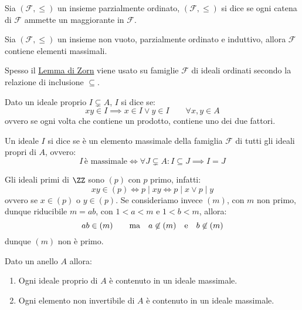 \documentclass[11pt]{scrartcl}
\begin{document}
\begin{definition}
    Sia $(\mathcal{F}, \leqslant)$ un insieme parzialmente ordinato, $(\mathcal{F}, \leqslant)$ si dice  se ogni catena di $\mathcal{F}$
    ammette un maggiorante in $\mathcal{F}$.
\end{definition}

\begin{lemma}
    \label{zorn}
    Sia $(\mathcal{F}, \leqslant)$ un insieme non vuoto, parzialmente ordinato e induttivo, allora $\mathcal{F}$ contiene elementi massimali.
\end{lemma}

\begin{remark}
    Spesso il \hyperref[zorn]{Lemma di Zorn} viene usato su famiglie $\mathcal{F}$ di ideali ordinati secondo la relazione di inclusione $\subseteq$.
\end{remark}

\begin{definition}
    Dato un ideale proprio $I \subsetneq A$, $I$ si dice  se:
        \[ xy \in I \implies x \in I \vee y \in I \qquad \forall x,y \in A
            \]
    ovvero se ogni volta che contiene un prodotto, contiene uno dei due fattori.
\end{definition}

\begin{definition}
    Un ideale $I$ si dice  se è un elemento massimale della famiglia $\mathcal{F}$ di tutti gli ideali propri di $A$, ovvero:
        \[ I \, \text{è massimale} \iff \forall J \subsetneq A : I \subseteq J \implies I = J
            \]
\end{definition}

\begin{example}
    Gli ideali primi di $\ZZ$ sono $(p)$ con $p$ primo, infatti:
    \[ xy \in (p) \iff p \mid xy \iff p \mid x \vee p \mid y
        \]
    ovvero se $x \in (p)$ o $y \in (p)$. Se consideriamo invece $(m)$, con $m$ non primo, dunque riducibile $m = ab$, con $1<a<m$ e $1<b<m$, allora:
    \[ ab \in (m) \qquad \text{ma} \quad a \not\in (m) \quad \text e \quad b \not\in (m)
        \]
    dunque $(m)$ non è primo.
\end{example}

\begin{proposition}
    Dato un anello $A$ allora:
    \begin{enumerate}[(1)]
        \item Ogni ideale proprio di $A$ è contenuto in un ideale massimale.
        \item Ogni elemento non invertibile di $A$ è contenuto in un ideale massimale.
    \end{enumerate}
\end{proposition}
\end{document}

